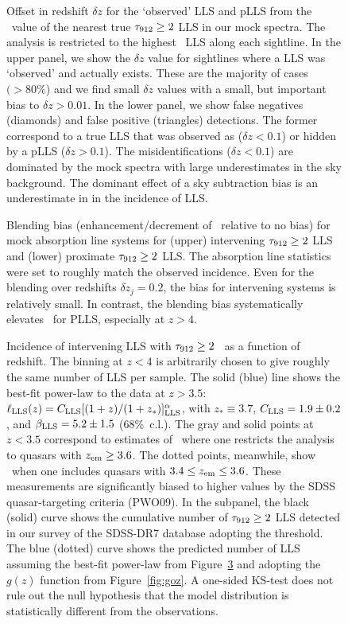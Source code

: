 \documentclass[12pt,preprint]{aastex}
\begin{document}
\begin{figure}
\caption{Offset in redshift $\delta z$ for the `observed' LLS and pLLS
from the \zabs\ value of the nearest true $\tau_{\rm 912} \ge 2$ LLS
in our mock spectra.  The analysis is restricted to the highest
\zabs\ LLS along each sightline.
In the upper panel, we show the $\delta z$ value for sightlines
where a LLS was `observed' and actually exists.  These are the majority
of cases $(>80\%$)
and we find small $\delta z$ values with a small, but important
bias to $\delta z > 0.01$.
In the lower panel, we show false negatives (diamonds) and false
positive (triangles) detections.  The former correspond to a true LLS
that was observed as ($\delta z < 0.1$) or hidden by a pLLS ($\delta z > 0.1$).
The misidentifications ($\delta z < 0.1$) are dominated by the mock
spectra with large underestimates in the sky background.  The dominant
effect of a sky subtraction bias is an underestimate in in the incidence
of LLS.
}
\label{fig:mockdz}
\end{figure}

\begin{figure}
\caption{Blending bias (enhancement/decrement of \lzlls\ relative
to no bias) for mock absorption line systems for 
(upper) intervening $\tau_{\rm 912} \ge 2$ LLS and
(lower) proximate $\tau_{\rm 912} \ge 2$ LLS.
The absorption line statistics were set to roughly match the observed
incidence. 
Even for the blending over redshifts $\delta z_j = 0.2$, the bias
for intervening systems is relatively small.
In contrast, the blending bias systematically elevates \lzlls\ for PLLS,
especially at $z>4$.
}
\label{fig:bbias}
\end{figure}


\begin{figure}
\caption{Incidence of intervening LLS with $\tau_{\rm 912} \ge 2$ \lzlls\
as a function of redshift.  
The binning at $z<4$ is arbitrarily chosen to give roughly the
same number of LLS per sample.  
The solid (blue) line shows the best-fit power-law
to the data at $z > 3.5$:  
$\ell_{\rm{LLS}}(z) = C_{\rm LLS} [(1+z)/(1+z_*)]^\alpha_{\rm LLS}$, 
with $z_* \equiv 3.7$, $C_{\rm LLS} = 1.9 \pm 0.2$, and
$\beta_{\rm LLS} = 5.2 \pm 1.5$ (68\%\ c.l.).
The gray and solid points at $z < 3.5$ correspond to estimates
of \lzlls\ where one restricts the analysis to quasars
with $z_{\rm em} \ge 3.6$.  The dotted points, meanwhile, show
\lzlls\ when one includes quasars with $3.4 \le z_{\rm em} \le 3.6$.
These measurements are significantly biased to higher values by the
SDSS quasar-targeting criteria (PWO09).
In the subpanel, 
the black (solid) curve shows the cumulative number of
$\tau_{\rm 912} \ge 2$ LLS detected in our survey of the SDSS-DR7
database adopting the  threshold.
The blue (dotted) curve shows the predicted number of LLS assuming
the best-fit power-law from Figure~\ref{fig:loz_lls} and adopting the
\sna=2 $g(z)$ function from Figure~\ref{fig:goz}.  
A one-sided KS-test does not rule out the null hypothesis that
the model distribution is statistically different from the observations.
}
\label{fig:loz_lls}
\end{figure}
\end{document}
